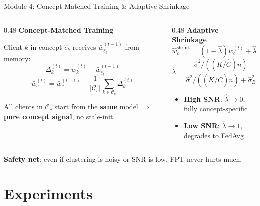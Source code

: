 \documentclass[aspectratio=169,11pt]{beamer}
\newcommand{\wbar}{\bar{w}}
\newcommand{\what}{\hat{w}}
\begin{document}
\begin{frame}{Module 4: Concept-Matched Training \& Adaptive Shrinkage}

\begin{columns}[T]
\begin{column}{0.48\textwidth}
\textbf{Concept-Matched Training}

Client $k$ in concept $\hat{c}_k$ receives $\wbar_{\hat{c}_k}^{(t-1)}$ from memory:
\vspace{-2pt}
$$\Delta_k^{(t)} = w_k^{(t)} - \wbar_{\hat{c}_k}^{(t-1)}$$
\vspace{-8pt}
$$\wbar_c^{(t)} = \wbar_c^{(t-1)} + \frac{1}{|\mathcal{C}_c|}\sum_{k\in\mathcal{C}_c}\Delta_k^{(t)}$$

\vspace{-2pt}
{\small All clients in $\mathcal{C}_c$ start from the \textbf{same} model $\Rightarrow$ \textbf{pure concept signal}, no stale-init.}
\end{column}

\begin{column}{0.48\textwidth}
\textbf{Adaptive Shrinkage}
\vspace{-2pt}
$$\what_c^{\mathrm{shrink}} = (1{-}\hat\lambda)\wbar_c^{(t)} + \hat\lambda\,\wbar^{(t)}$$
\vspace{-8pt}
$$\hat\lambda = \frac{\hat\sigma^2/((K/\hat{C})n)}{\hat\sigma^2/((K/\hat{C})n) + \hat\sigma_B^2}$$

\vspace{-2pt}
\begin{itemize}\setlength\itemsep{1pt}
  \item \textbf{High SNR}: $\hat\lambda \to 0$, fully concept-specific
  \item \textbf{Low SNR}: $\hat\lambda \to 1$, degrades to FedAvg
\end{itemize}
\end{column}
\end{columns}

\vspace{4pt}
\centering
\textcolor{cC}{\textbf{Safety net}}: even if clustering is noisy or SNR is low, FPT never hurts much.
\end{frame}

\section{Experiments}
\end{document}
